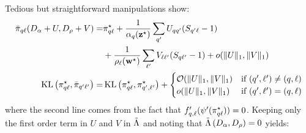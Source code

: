 Tedious but straightforward manipulations show:
\begin{align*}
\baralkl(D_{\pii} + U,  D_{\rhoo} + V) = & \alskl + \frac{1}{\pik(\bzs)} \sum_{\kp} U_{\kk\kp} (S_{\kp\el} - 1) \\
& + \frac{1}{\rhol(\bws)} \sum_{\lp} V_{\el\lp} (S_{\kk\lp} - 1) + \smallO(\|U\|_1, \|V\|_1) \\
\KL\left(\alskl, \baral_{\kp\lp} \right)  = & \KL\left(\alskl, \alskplp \right) + 
  \begin{cases} 
    \bigO(\|U\|_1, \|V\|_1) & \text{if } (\kp, \lp) \neq (\kk, \el) \\
    \smallO(\|U\|_1, \|V\|_1) & \text{if } (\kp, \lp) = (\kk, \el) \\
  \end{cases}
\end{align*}
where the second line comes from the fact that $f_{q, \ell}'(\psi'(\pi^\star_{q\ell})) = 0$. Keeping only the first order term in $U$ and $V$ in $\tilde{\Lambda}$ and noting that $\tilde{\Lambda}\left( D_{\alpha}, D_{\rho}\right) = 0$ yields:

